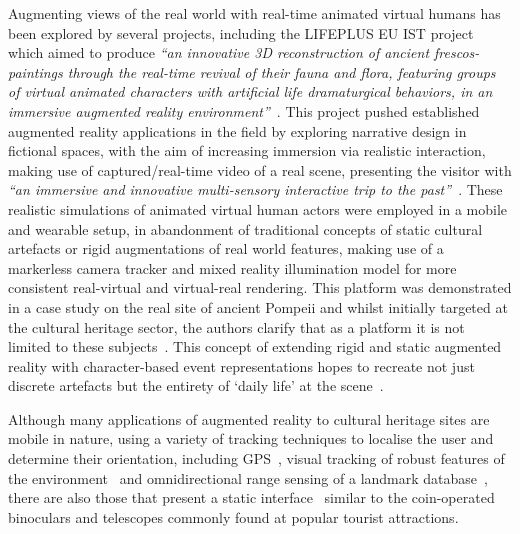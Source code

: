 Augmenting views of the real world with real-time animated virtual humans has been explored by several projects, including the LIFEPLUS EU IST project which aimed to produce \textit{``an innovative 3D reconstruction of ancient frescos-paintings through the real-time revival of their fauna and flora, featuring groups of virtual animated characters with artificial life dramaturgical behaviors, in an immersive augmented reality environment''}~\cite{Papagiannakis2004}. This project pushed established augmented reality applications in the field by exploring narrative design in fictional spaces, with the aim of increasing immersion via realistic interaction, making use of captured/real-time video of a real scene, presenting the visitor with \textit{``an immersive and innovative multi-sensory interactive trip to the past''}~\cite{Papagiannakis2005}. These realistic simulations of animated virtual human actors were employed in a mobile and wearable setup, in abandonment of traditional concepts of static cultural artefacts or rigid augmentations of real world features, making use of a markerless camera tracker and mixed reality illumination model for more consistent real-virtual and virtual-real rendering. This platform was demonstrated in a case study on the real site of ancient Pompeii and whilst initially targeted at the cultural heritage sector, the authors clarify that as a platform it is not limited to these subjects~\cite{Papagiannakis2007}. This concept of extending rigid and static augmented reality with character-based event representations hopes to recreate not just discrete artefacts but the entirety of `daily life' at the scene~\cite{Papagiannakis2009}.

Although many applications of augmented reality to cultural heritage sites are mobile in nature, using a variety of tracking techniques to localise the user and determine their orientation, including GPS~\cite{vlahakis:archeoguide}, visual tracking of robust features of the environment~\cite{Kim2009} and omnidirectional range sensing of a landmark database~\cite{Taketomi2011}, there are also those that present a static interface~\cite{Weng2012} similar to the coin-operated binoculars and telescopes commonly found at popular tourist attractions.


